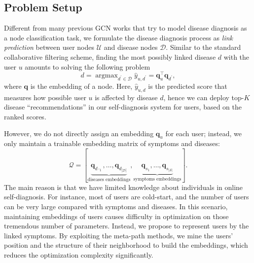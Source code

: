 \documentclass[sigconf]{acmart}
\newcommand{\q}{\bm{q}}
\newcommand{\bs}{\mathcal{S}}
\newcommand{\bd}{\mathcal{D}}
\newcommand{\bu}{\mathcal{U}}
\begin{document}
\subsection{Problem Setup}
Different from many previous GCN works that try to model disease diagnosis as a node classification task, we formulate the disease diagnosis process as \emph{link prediction} between user nodes $\bu$ and disease nodes $\bd$. Similar to the standard collaborative filtering scheme, finding the most possibly linked disease $d$ with the user $u$ amounts to solving the following problem
\begin{equation}
d = \mathop{\arg\max}_{d^\prime \in \bd}\hat{y}_{u,d^\prime}= \q_u^{\top}\q_{d^\prime},
\label{eq:getscore}
\end{equation}
where $\q$ is the embedding of a node. Here, $\hat{y}_{u,d}$ is the predicted score that measures how possible user $u$ is affected by disease $d$, hence we can deploy top-$K$ disease ``recommendations''  in our self-diagnosis system for users, based on the ranked scores.

However, we do not directly assign an embedding $\q_u$ for each user; instead, we only maintain a trainable embedding matrix of symptoms and diseases:
\begin{equation}
\mathcal{Q}=  [\underbrace{\q_{d·_1},\dots,\q_{d_{|\bd|}}}_{\text{diseases embeddings}}, \underbrace{\q_{s_1},\dots, \q_{s_{|\bs|}}}_{\text{symptoms embeddings}}].
\end{equation}
The main reason is that we have limited knowledge about individuals in online self-diagnosis. For instance, most of users are cold-start, and the number of users can be very large compared with symptoms and diseases. In this scenario, maintaining embeddings of users causes difficulty in optimization on those tremendous number of parameters. Instead, we propose to represent users by the linked symptoms. By exploiting the meta-path methods, we mine the users' position and the structure of their neighborhood to build the embeddings, which reduces the optimization complexity significantly.
\end{document}
